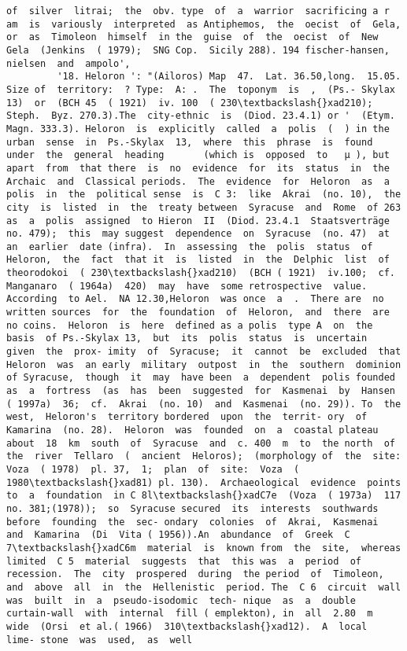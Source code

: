 \documentclass[11pt]{article}
\begin{document}
\begin{Verbatim}[commandchars=\\\{\}]
 of  silver  litrai;  the  obv. type  of  a  warrior  sacrificing a r am  is  variously  interpreted  as Antiphemos,  the  oecist  of  Gela,  or  as  Timoleon  himself  in the  guise  of  the  oecist  of  New  Gela  (Jenkins  ( 1979);  SNG Cop.  Sicily 288). 194 fischer-hansen,  nielsen  and  ampolo',
         '18. Heloron ': "(Ailoros) Map  47.  Lat. 36.50,long.  15.05.  Size of  territory:  ? Type:  A: .  The  toponym  is  ,  (Ps.- Skylax 13)  or  (BCH 45  ( 1921)  iv. 100  ( 230\textbackslash{}xad210); Steph.  Byz. 270.3).The  city-ethnic  is  (Diod. 23.4.1) or '  (Etym.  Magn. 333.3). Heloron  is  explicitly  called  a  polis  (  ) in the urban  sense  in  Ps.-Skylax  13,  where  this  phrase  is  found under  the  general  heading       (which is  opposed  to   µ ), but  apart  from  that there  is  no  evidence  for  its  status  in  the  Archaic  and  Classical periods.  The  evidence  for  Heloron  as  a  polis  in  the  political sense  is  C 3:  like  Akrai  (no. 10),  the  city  is  listed  in  the  treaty between  Syracuse  and  Rome  of 263  as  a  polis  assigned  to Hieron  II  (Diod. 23.4.1  Staatsverträge  no. 479);  this  may suggest  dependence  on  Syracuse  (no. 47)  at  an  earlier  date (infra).  In  assessing  the  polis  status  of  Heloron,  the  fact  that it  is  listed  in  the  Delphic  list  of  theorodokoi  ( 230\textbackslash{}xad210)  (BCH ( 1921)  iv.100;  cf.  Manganaro  ( 1964a)  420)  may  have  some retrospective  value.  According  to Ael.  NA 12.30,Heloron  was once  a  .  There are  no  written sources  for  the  foundation  of  Heloron,  and  there  are  no coins.  Heloron  is  here  defined as a polis  type A  on  the  basis  of Ps.-Skylax 13,  but  its  polis  status  is  uncertain  given  the  prox- imity  of  Syracuse;  it  cannot  be  excluded  that  Heloron  was  an early  military  outpost  in  the  southern  dominion  of Syracuse,  though  it  may  have been  a  dependent  polis founded  as  a  fortress  (as  has  been  suggested  for  Kasmenai  by  Hansen  ( 1997a)  36;  cf.  Akrai  (no. 10)  and  Kasmenai  (no. 29)). To  the  west,  Heloron's  territory bordered  upon  the  territ- ory  of  Kamarina  (no. 28).  Heloron  was  founded  on  a  coastal plateau  about  18  km  south  of  Syracuse  and  c. 400  m  to  the north  of  the  river  Tellaro  (  ancient  Heloros);  (morphology of  the  site:  Voza  ( 1978)  pl. 37,  1;  plan  of  site:  Voza  ( 1980\textbackslash{}xad81) pl. 130).  Archaeological  evidence  points  to  a  foundation  in C 8l\textbackslash{}xadC7e  (Voza  ( 1973a)  117  no. 381;(1978));  so  Syracuse secured  its  interests  southwards  before  founding  the  sec- ondary  colonies  of  Akrai,  Kasmenai  and  Kamarina  (Di  Vita ( 1956)).An  abundance  of  Greek  C 7\textbackslash{}xadC6m  material  is  known from  the  site,  whereas  limited  C 5  material  suggests  that  this was  a  period  of  recession.  The  city  prospered  during  the period  of  Timoleon,  and  above  all  in  the  Hellenistic  period. The  C 6  circuit  wall  was  built  in  a  pseudo-isodomic  tech- nique  as  a  double  curtain-wall  with  internal  fill ( emplekton), in  all  2.80  m  wide  (Orsi  et al.( 1966)  310\textbackslash{}xad12).  A  local  lime- stone  was  used,  as  well  
\end{Verbatim}
\end{document}
